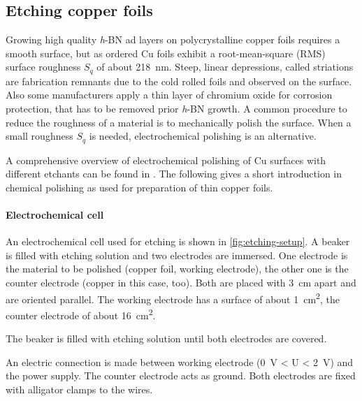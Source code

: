 \subsection{Etching copper foils}
Growing high quality \textit{h}-BN ad layers on polycrystalline copper foils requires a smooth surface, but as ordered Cu foils exhibit a root-mean-square (RMS) surface roughness $S_q$ of about \SI{218}{\nm}\cite{bin_zhang_low-temperature_2012}. Steep, linear depressions, called striations are fabrication remnants due to the cold rolled foils and observed on the surface\cite{kim_synthesis_2012-1}. Also some manufacturers apply a thin layer of chromium oxide for corrosion protection\cite{bin_zhang_low-temperature_2012}, that has to be removed prior \textit{h}-BN growth. A common procedure to reduce the roughness of a material is to mechanically polish the surface. When a small roughness $S_q$ is needed, electrochemical polishing is an alternative.

A comprehensive overview of  electrochemical polishing of Cu surfaces with different etchants  can be found in \cite{jinshan_electrochemical_2004}. The following gives a short introduction in chemical polishing as used for preparation of thin copper foils.\cite{antoine_polishing_1999, lilje_improved_2004, schulz_engeneering_2018}


\label{sec:etching}
\paragraph{Electrochemical cell}
An electrochemical cell used for etching is shown in \autoref{fig:etching-setup}. A beaker is filled with etching solution and two electrodes are immersed. One electrode is the material to be polished (copper foil, working electrode), the other one is the counter electrode (copper in this case, too). Both are placed with \SI{3}{\centi \meter} apart and are oriented parallel. The working electrode has a surface of about \SI{1}{\square \centi \meter}, the counter electrode of about \SI{16}{\square \centi \meter}. 

The beaker is filled with etching solution until both electrodes are covered.

An electric connection is made between working electrode (\SI{0}{\volt} < U < \SI{2}{\volt}) and the power supply. The counter electrode acts as ground. Both electrodes are fixed with alligator clamps to the wires.

